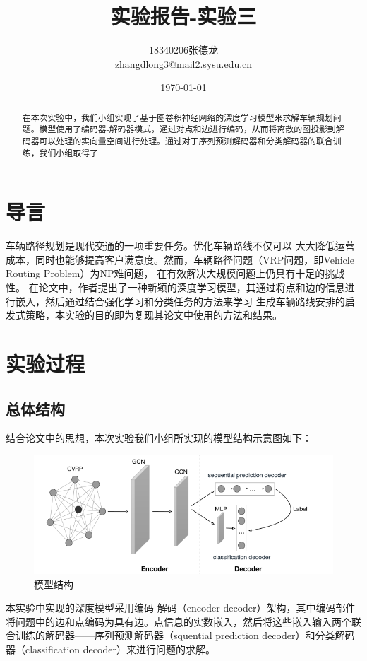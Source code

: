 \documentclass[withoutpreface,bwprint]{cumcmthesis} %
\title{实验报告-实验三}
\author{18340206张德龙 \\
	zhangdlong3@mail2.sysu.edu.cn
}
\date{\today}
\begin{document}
\maketitle
\begin{abstract}
 
在本次实验中，我们小组实现了基于图卷积神经网络的深度学习模型来求解车辆规划问题。模型使用了编码器-解码器模式，通过对点和边进行编码，从而将离散的图投影到解码器可以处理的实向量空间进行处理。通过对于序列预测解码器和分类解码器的联合训练，我们小组取得了%
\end{abstract}

\section{导言}

	
	
	车辆路径规划是现代交通的一项重要任务。优化车辆路线不仅可以
	大大降低运营成本，同时也能够提高客户满意度。然而，车辆路径问题（VRP问题，即Vehicle Routing Problem）为NP难问题，
	在有效解决大规模问题上仍具有十足的挑战性。
	在论文\cite{1}中，作者提出了一种新颖的深度学习模型，其通过将点和边的信息进行嵌入，然后通过结合强化学习和分类任务的方法来学习
	生成车辆路线安排的启发式策略，本实验的目的即为复现其论文中使用的方法和结果。

\section{实验过程}

\subsection{总体结构}
	结合论文\cite{1}中的思想，本次实验我们小组所实现的模型结构示意图如下：
	\begin{figure}[H]
		\centering
		\includegraphics[width=1\linewidth]{struct}
		\caption{模型结构}
	\end{figure}
	本实验中实现的深度模型采用编码-解码（encoder-decoder）架构，其中编码部件将问题中的边和点编码为具有边。点信息的实数嵌入，然后将这些嵌入输入两个联合训练的解码器——序列预测解码器（squential prediction decoder）和分类解码器（classification  decoder）来进行问题的求解。
\end{document}
